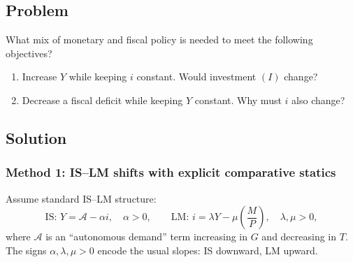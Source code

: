 \documentclass[12pt]{article}
\begin{document}
\subsection*{Problem}
What mix of monetary and fiscal policy is needed to meet the following objectives?
\begin{enumerate}[label=(\alph*)]
  \item Increase \(Y\) while keeping \(i\) constant. Would investment \((I)\) change?
  \item Decrease a fiscal deficit while keeping \(Y\) constant. Why must \(i\) also change?
\end{enumerate}

\subsection*{Solution}

\subsubsection*{Method 1: IS--LM shifts with explicit comparative statics}
Assume standard IS--LM structure:
\[
\text{IS: } Y = \mathcal{A} - \alpha i,\quad \alpha>0,
\qquad
\text{LM: } i = \lambda Y - \mu\left(\frac{M}{P}\right),\quad \lambda,\mu>0,
\]
where \(\mathcal{A}\) is an ``autonomous demand'' term increasing in \(G\) and decreasing in \(T\).
The signs \(\alpha,\lambda,\mu>0\) encode the usual slopes: IS downward, LM upward.
\end{document}
